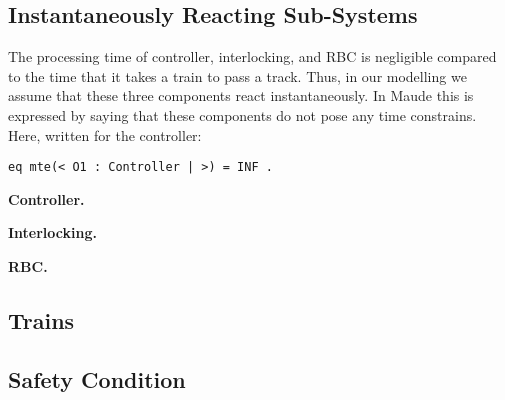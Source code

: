 \subsection{Instantaneously Reacting Sub-Systems}
\label{ssec:instan}

The processing time of controller, interlocking, and RBC is negligible
compared to the time that it takes a train to pass a track. Thus, in
our modelling we assume that these three components react
instantaneously. In Maude this is expressed by saying that these
components do not pose any time constrains. Here, written for the
controller:
%
\begin{lstlisting}[columns=fixed]
eq mte(< O1 : Controller | >) = INF .
\end{lstlisting} 

\vspace{1ex}
\noindent
{\bf Controller.}
 

\vspace{1ex}
\noindent
{\bf Interlocking.}
 

\vspace{1ex}
\noindent
{\bf RBC.}


\subsection{Trains}


\subsection{Safety Condition}
\label{sec:safetycondmodelling}



